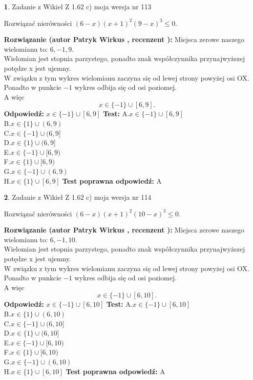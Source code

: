 \documentclass[12pt, a4paper]{article}
\theoremstyle{definition} %
\newtheorem{zad}{}
\newcommand{\zadStart}[1]{\begin{zad}#1\newline}
\newcommand{\zadStop}{\end{zad}}
\newcommand{\rozwStart}[2]{\noindent \textbf{Rozwiązanie (autor #1 , recenzent #2): }\newline}
\newcommand{\rozwStop}{\newline}
\newcommand{\odpStart}{\noindent \textbf{Odpowiedź:}\newline}
\newcommand{\odpStop}{\newline}
\newcommand{\testStart}{\noindent \textbf{Test:}\newline}
\newcommand{\testStop}{\newline}
\newcommand{\kluczStart}{\noindent \textbf{Test poprawna odpowiedź:}\newline}
\newcommand{\kluczStop}{\newline}
\begin{document}
\zadStart{Zadanie z Wikieł Z 1.62 c) moja wersja nr 113}

Rozwiązać nierówności $(6-x)(x+1)^{2}(9-x)^{3}\le0$.
\zadStop
\rozwStart{Patryk Wirkus}{}
Miejsca zerowe naszego wielomianu to: $6, -1, 9$.\\
Wielomian jest stopnia parzystego, ponadto znak współczynnika przy\linebreak najwyższej potędze x jest ujemny.\\ W związku z tym wykres wielomianu zaczyna się od lewej strony powyżej osi OX.\\
Ponadto w punkcie $-1$ wykres odbija się od osi poziomej.\\
A więc $$x \in \{-1\} \cup [6,9].$$
\rozwStop
\odpStart
$x \in \{-1\} \cup [6,9]$
\odpStop
\testStart
A.$x \in \{-1\} \cup [6,9]$\\
B.$x \in \{1\} \cup (6,9)$\\
C.$x \in \{-1\} \cup (6,9]$\\
D.$x \in \{1\} \cup (6,9]$\\
E.$x \in \{-1\} \cup [6,9)$\\
F.$x \in \{1\} \cup [6,9)$\\
G.$x \in \{-1\} \cup (6,9)$\\
H.$x \in \{1\} \cup [6,9]$
\testStop
\kluczStart
A
\kluczStop



\zadStart{Zadanie z Wikieł Z 1.62 c) moja wersja nr 114}

Rozwiązać nierówności $(6-x)(x+1)^{2}(10-x)^{3}\le0$.
\zadStop
\rozwStart{Patryk Wirkus}{}
Miejsca zerowe naszego wielomianu to: $6, -1, 10$.\\
Wielomian jest stopnia parzystego, ponadto znak współczynnika przy\linebreak najwyższej potędze x jest ujemny.\\ W związku z tym wykres wielomianu zaczyna się od lewej strony powyżej osi OX.\\
Ponadto w punkcie $-1$ wykres odbija się od osi poziomej.\\
A więc $$x \in \{-1\} \cup [6,10].$$
\rozwStop
\odpStart
$x \in \{-1\} \cup [6,10]$
\odpStop
\testStart
A.$x \in \{-1\} \cup [6,10]$\\
B.$x \in \{1\} \cup (6,10)$\\
C.$x \in \{-1\} \cup (6,10]$\\
D.$x \in \{1\} \cup (6,10]$\\
E.$x \in \{-1\} \cup [6,10)$\\
F.$x \in \{1\} \cup [6,10)$\\
G.$x \in \{-1\} \cup (6,10)$\\
H.$x \in \{1\} \cup [6,10]$
\testStop
\kluczStart
A
\kluczStop
\end{document}
